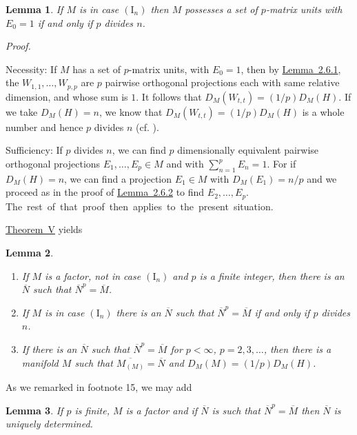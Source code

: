 \documentclass[b5paper,twoside]{article}
\newcommand{\thmref}[2]{\hyperref[#1]{\mbox{Theorem~#2}}}
\newcommand{\lemref}[2]{\hyperref[#1]{\mbox{Lemma~#2}}}
\theoremstyle{mvnplain}
\newtheorem{lemma}{Lemma}[section]
\renewenvironment{proof}[1][Proof]{%
  \par\addvspace{0.35\baselineskip}%
  \noindent\textit{#1.}\ \normalfont\ignorespaces
}{%
  \par\addvspace{0.35\baselineskip}%
}
\newcommand{\M}{\mathbf M}
\newcommand{\N}{\mathbf N}
\newcommand{\Hilbert}{\mathfrak H}
\def\M{M}%
\def\N{N}%
\def\Hilbert{H}%
\def\mathfrak#1{#1}%
\begin{document}
\begin{lemma}\label{lem:2.6.3}
If $\M$ is in case $(\mathrm I_n)$ then $\M$ possesses a set of $p$-matrix
units with $E_0=1$ if and only if $p$ divides $n$.
\end{lemma}
\begin{proof}
Necessity: If $\M$ has a set of $p$-matrix units, with $E_0=1$, then by
\lemref{lem:2.6.1}{2.6.1}, the $W_{1,1},\ldots,W_{p,p}$ are $p$ pairwise
orthogonal projections each with same relative dimension, and whose sum is
$1$.  It follows that
$D_{\M}(W_{t,t})=(1/p)D_{\M}(\Hilbert)$.  If we take
$D_{\M}(\Hilbert)=n$, we know that
$D_{\M}(W_{t,t})=(1/p)D_{\M}(\Hilbert)$ is a whole number and hence $p$
divides $n$ (cf. \cite[p.~172, Theorem~VIII]{ref5}).

Sufficiency: If $p$ divides $n$, we can find $p$ dimensionally equivalent
pairwise orthogonal projections $E_1,\ldots,E_p\in\M$ and with
$\sum_{n=1}^{p}E_n=1$.  For if $D_{\M}(\Hilbert)=n$, we can find a
projection $E_1\in\M$ with $D_{\M}(E_1)=n/p$ and we proceed as in the proof
of \lemref{lem:2.6.2}{2.6.2} to find $E_2,\ldots,E_p$.
\mbox{The rest of that proof then applies to the present situation.}
\end{proof}

\thmref{thm:V}{V} yields
\begin{lemma}\label{lem:2.6.4}
\begin{enumerate}[label=(\roman*)]
\item If $\M$ is a factor, not in case $(\mathrm I_n)$ and $p$ is a finite
integer, then there is an $\overline{\N}$ such that
$\overline{\N}^{p}=\overline{\M}$.
\item If $\M$ is in case $(\mathrm I_n)$ there is an $\overline{\N}$ such
that $\overline{\N}^{p}=\overline{\M}$ if and only if $p$ divides $n$.
\item If there is an $\overline{\N}$ such that
$\overline{\N}^{p}=\overline{\M}$ for
$p<\infty$, $p=2,3,\ldots$, then there is a manifold $\mathfrak M$ such that
$\overline{\M_{(\mathfrak M)}}=\overline{\N}$ and
$D_{\M}(\mathfrak M)=(1/p)D_{\M}(\Hilbert)$.
\end{enumerate}
\end{lemma}

As we remarked in footnote 15, we may add
\begin{lemma}\label{lem:2.6.5}
If $p$ is finite, $\M$ is a factor and if $\overline{\N}$ is such that
$\overline{\N}^{p}=\overline{\M}$ then $\overline{\N}$ is uniquely
determined.
\end{lemma}
\end{document}
